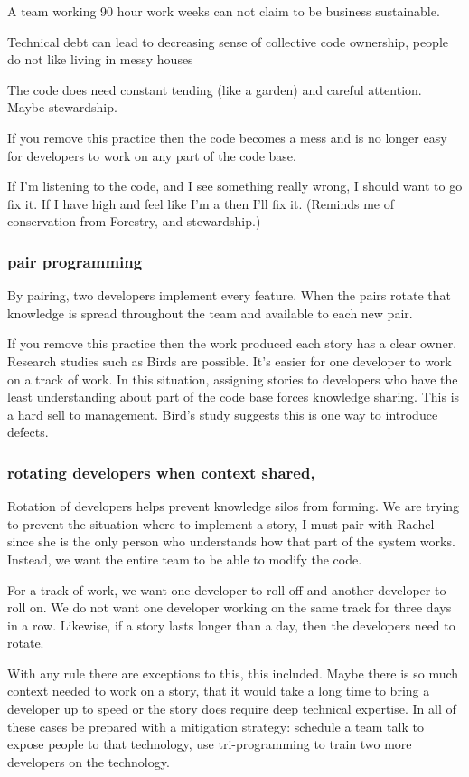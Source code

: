 A team working 90 hour work weeks can not claim to be business sustainable. 

Technical debt can lead to decreasing sense of collective code ownership, people do not like living in messy houses

The code does need constant tending (like a garden) and careful attention. Maybe stewardship.

If you remove this practice then the code becomes a mess and is no longer easy for developers to work on any part of the code base.

If I'm listening to the code, and I see something really wrong, I should want to go fix it. If I have high  and feel like I'm a  then I'll fix it. (Reminds me of conservation from Forestry, and stewardship.)


\subsubsection{pair programming}
By pairing, two developers implement every feature. When the pairs rotate that knowledge is spread throughout the team and available to each new pair. 

If you remove this practice then the work produced each story has a clear owner. Research studies such as Birds are possible. It's easier for one developer to work on a track of work. In this situation, assigning stories to developers who have the least understanding about part of the code base forces knowledge sharing. This is a hard sell to management. Bird's study suggests this is one way to introduce defects. 

\subsubsection{rotating developers when context shared,}
Rotation of developers helps prevent knowledge silos from forming. We are trying to prevent the situation where to implement a story, I must pair with Rachel since she is the only person who understands how that part of the system works. Instead, we want the entire team to be able to modify the code. 

For a track of work, we want one developer to roll off and another developer to roll on.  We do not want one developer working on the same track for three days in a row. Likewise, if a story lasts longer than a day, then the developers need to rotate.

With any rule there are exceptions to this, this included. Maybe there is so much context needed to work on a story, that it would take a long time to bring a developer up to speed or the story does require deep technical expertise. In all of these cases be prepared with a mitigation strategy: schedule a team talk to expose people to that technology, use tri-programming to train two more developers on the technology. 

